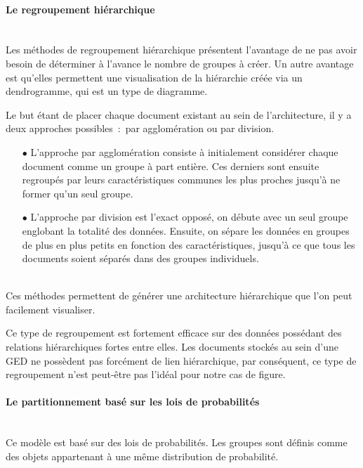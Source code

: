 \paragraph*{Le regroupement hiérarchique}
~\\

Les méthodes de regroupement hiérarchique présentent l'avantage de ne pas avoir besoin de déterminer à l'avance le nombre de groupes à créer.
Un autre avantage est qu'elles permettent une visualisation de la hiérarchie créée via un dendrogramme, qui est un type de diagramme.

Le but étant de placer chaque document existant au sein de l'architecture, il y a deux approches possibles~:~par agglomération ou par division.
\\
\begin{itemize}
    \item[\tiny$\bullet$] L'approche par agglomération consiste à initialement considérer chaque document comme un groupe à part entière.
    Ces derniers sont ensuite regroupés par leurs caractéristiques communes les plus proches jusqu'à ne former qu'un seul groupe.
    \item[\tiny$\bullet$] L'approche par division est l'exact opposé, on débute avec un seul groupe englobant la totalité des données.
    Ensuite, on sépare les données en groupes de plus en plus petits en fonction des caractéristiques, jusqu'à ce que tous les documents soient séparés dans des groupes individuels.
\end{itemize}
~\\

Ces méthodes permettent de générer une architecture hiérarchique que l'on peut facilement visualiser.

Ce type de regroupement est fortement efficace sur des données possédant des relations hiérarchiques fortes entre elles.
Les documents stockés au sein d'une GED ne possèdent pas forcément de lien hiérarchique, par conséquent, ce type de regroupement n'est peut-être pas l'idéal pour notre cas de figure.

\paragraph*{Le partitionnement basé sur les lois de probabilités}
~\\

Ce modèle est basé sur des lois de probabilités.
Les groupes sont définis comme des objets appartenant à une même distribution de probabilité.

